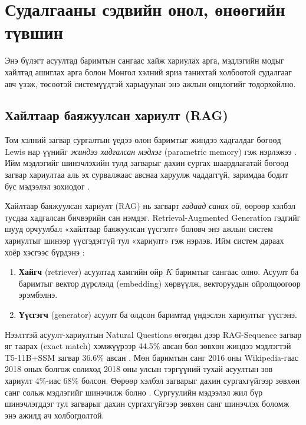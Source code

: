 \chapter{Судалгааны сэдвийн онол, өнөөгийн түвшин}
\label{ch:literature}


Энэ бүлэгт асуултад баримтын сангаас хайж хариулах арга, мэдлэгийн модыг хайлтад ашиглах арга болон Монгол хэлний яриа танихтай холбоотой судалгааг авч үзэж, төсөөтэй системүүдтэй харьцуулан энэ ажлын онцлогийг тодорхойлно.

\section{Хайлтаар баяжуулсан хариулт (RAG)}
\label{sec:lit-rag}

Том хэлний загвар сургалтын үедээ олон баримтыг жиндээ хадгалдаг бөгөөд Lewis нар үүнийг \textit{жиндээ хадгалсан мэдлэг} (parametric memory) гэж нэрлэжээ \cite{lewis2020rag}. Ийм мэдлэгийг шинэчлэхийн тулд загварыг дахин сургах шаардлагатай бөгөөд загвар хариултаа аль эх сурвалжаас авснаа харуулж чаддаггүй, заримдаа бодит бус мэдээлэл зохиодог \cite{lewis2020rag}.

Хайлтаар баяжуулсан хариулт (\acs{RAG}) нь загварт \textit{гадаад санах ой}, өөрөөр хэлбэл тусдаа хадгалсан бичвэрийн сан нэмдэг. Retrieval-Augmented Generation гэдгийг шууд орчуулбал «хайлтаар баяжуулсан үүсгэлт» боловч энэ ажлын систем хариултыг шинээр үүсгэдэггүй тул «хариулт» гэж нэрлэв. Ийм систем дараах хоёр хэсгээс бүрдэнэ \cite{lewis2020rag}:
\begin{enumerate}
    \item \textbf{Хайгч} (retriever) асуултад хамгийн ойр $K$ баримтыг сангаас олно. Асуулт ба баримтыг вектор дүрслэлд (embedding) хөрвүүлж, векторуудын ойролцоогоор эрэмбэлнэ.
    \item \textbf{Үүсгэгч} (generator) асуулт ба олдсон баримтад үндэслэн хариултыг үүсгэнэ.
\end{enumerate}

Нээлттэй асуулт-хариултын Natural Questions өгөгдөл дээр RAG-Sequence загвар яг таарах (exact match) хэмжүүрээр 44.5\% авсан бол зөвхөн жиндээ мэдлэгтэй T5-11B+SSM загвар 36.6\% авсан \cite{lewis2020rag}. Мөн баримтын санг 2016 оны Wikipedia-гаас 2018 оных болгож солиход 2018 оны улсын тэргүүний тухай асуултын зөв хариулт 4\%-иас 68\% болсон. Өөрөөр хэлбэл загварыг дахин сургахгүйгээр зөвхөн санг сольж мэдлэгийг шинэчилж болно \cite{lewis2020rag}. Сургуулийн мэдээлэл жил бүр шинэчлэгддэг тул загварыг дахин сургахгүйгээр зөвхөн санг шинэчлэх боломж энэ ажилд ач холбогдолтой.

